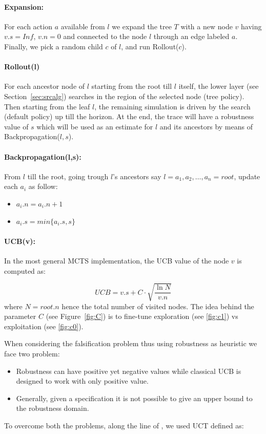 \documentclass[11pt]{article}
\begin{document}
\paragraph{Expansion:} For each action $a$ available from $l$ we expand the tree $T$ with a new node $v$ having $v.s=Inf$, $v.n=0$ and connected to the node $l$ through an edge labeled $a$. Finally, we pick a random child $c$ of $l$, and run Rollout($c$).

\paragraph{Rollout(l)} For each ancestor node of $l$ starting from the root till $l$ itself, the lower layer (see Section~\ref{sec:srcalg}) searches in the region of the selected node (tree policy). Then starting from the leaf $l$, the remaining simulation is driven by the search (default policy) up till the horizon. At the end, the trace will have a robustness value of $s$ which will be used as an estimate for $l$ and its ancestors by means of Backpropagation($l,s$).

\paragraph{Backpropagation(l,s):} From $l$ till the root, going trough $l$'s ancestors say $l=a_1, a_2, \dots, a_n=root$, update each $a_i$ as follow:
\begin{itemize}
    \item $a_i.n=a_i.n + 1$
    \item $a_i.s=min\{a_i.s, s\}$
\end{itemize}

\paragraph{UCB(v):} In the most general MCTS implementation, the UCB value of the node $v$ is computed as:

\begin{equation}
    UCB = v.s + C \cdot \sqrt{\frac{\ln N}{v.n}}
\end{equation}
where $N = root.n$ hence the total number of visited nodes. The idea behind the parameter $C$ (see Figure~\ref{fig:C}) is to fine-tune exploration (see \ref{fig:c1}) vs exploitation (see \ref{fig:c0}). 

When considering the falsification problem thus using robustness as heuristic we face two problem:
\begin{itemize}
    \item Robustness can have positive yet negative values while classical UCB is designed to work with only positive value. 
    \item Generally, given a specification it is not possible to give an upper bound to the robustness domain. 
\end{itemize}
To overcome both the problems, along the line of \cite{zhang2018two}, we used UCT defined as:
\end{document}
